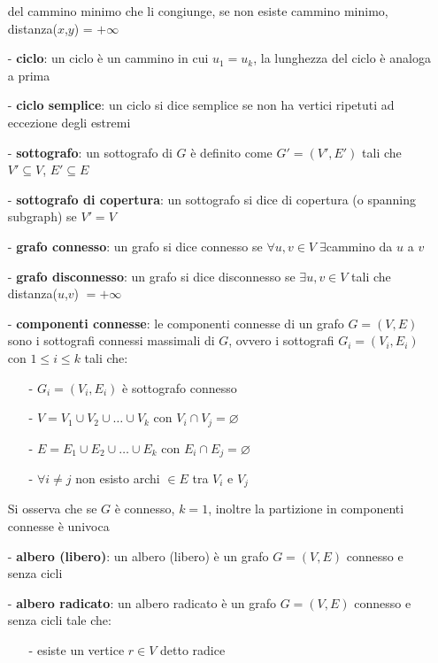\documentclass[a4paper]{article}
\begin{document}
\begin{itemize}[topsep=3pt, itemsep=0pt]
	del cammino minimo che li congiunge, se non esiste cammino minimo, distanza(\(x\),\(y\)) = \(+\infty\)
	\item[-] \textbf{ciclo}: un ciclo è un cammino in cui \(u_1 = u_k\), la lunghezza del ciclo è analoga a prima
	\item[-] \textbf{ciclo semplice}: un ciclo si dice semplice se non ha vertici ripetuti ad eccezione degli estremi
	\vspace{1em}
	\item[-] \textbf{sottografo}: un sottografo di \(G\) è definito come \(G' = (V',E')\) tali che \(V' \subseteq V\),  \(E' \subseteq E\)
	\item[-] \textbf{sottografo di copertura}: un sottografo si dice di copertura (o spanning subgraph) se \(V' = V\)
	\item[-] \textbf{grafo connesso}: un grafo si dice connesso se \(\forall u,v \in V \; \exists\)cammino da \(u\) a \(v\)
	\item[-] \textbf{grafo disconnesso}: un grafo si dice disconnesso se \(\exists u,v \in V\) tali che distanza(\(u\),\(v\)) \(= +\infty\)
	\item[-] \textbf{componenti connesse}: le componenti connesse di un grafo \(G = (V,E)\) sono i sottografi connessi massimali
	di \(G\), ovvero i sottografi \(G_i = (V_i, E_i)\) con \(1 \leq i \leq k\) tali che:
	\begin{itemize}[topsep=0pt, itemsep=0pt]
		\item[-] \(G_i = (V_i,E_i)\) è sottografo connesso
		\item[-] \(V = V_1 \cup V_2 \cup \dots \cup V_k\) con \(V_i \cap V_j = \varnothing\)
		\item[-] \(E = E_1 \cup E_2 \cup \dots \cup E_k\) con \(E_i \cap E_j = \varnothing\)
		\item[-] \(\forall i \neq j\) non esisto archi \(\in E\) tra \(V_i\) e \(V_j\)
	\end{itemize}
	\item[] Si osserva che se \(G\) è connesso, \(k = 1\), inoltre la partizione in componenti connesse è univoca
	\item[-] \textbf{albero (libero)}: un albero (libero) è un grafo \(G = (V,E)\) connesso e senza cicli
	\item[-] \textbf{albero radicato}: un albero radicato è un grafo \(G = (V,E)\) connesso e senza cicli tale che:
	\begin{itemize}[topsep=0pt, itemsep=0pt]
		\item[-] esiste un vertice \(r \in V\) detto radice

\end{itemize}
\end{itemize}
\end{document}

